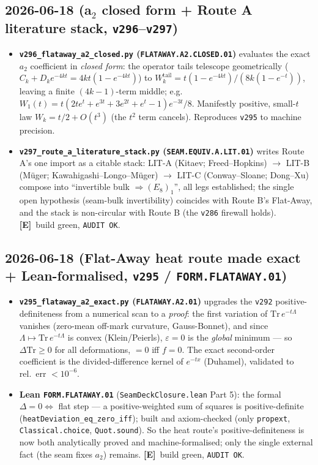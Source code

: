 \documentclass[11pt]{article}
\providecommand{\mE}{\textbf{[E]}}\providecommand{\mC}{\textbf{[C]}}
\providecommand{\vref}[1]{\texttt{#1}}
\begin{document}
\subsection*{2026-06-18 (a$_2$ closed form + Route A literature stack, \texttt{v296}--\texttt{v297})}
\begin{itemize}
\item \textbf{\texttt{v296\_flataway\_a2\_closed.py} (\texttt{FLATAWAY.A2.CLOSED.01})} evaluates the exact $a_2$
  coefficient in \emph{closed form}: the operator tails telescope geometrically
  ($C_k+D_k e^{-4kt}=4kt(1-e^{-4kt})$) to $W_k^{\mathrm{tail}}=t(1-e^{-4kt})/(8k(1-e^{-t}))$, leaving a finite
  $(4k{-}1)$-term middle; e.g.\ $W_1(t)=t(2t e^{t}+e^{3t}+3e^{2t}+e^{t}-1)e^{-3t}/8$. Manifestly positive,
  small-$t$ law $W_k=t/2+O(t^3)$ (the $t^2$ term cancels). Reproduces \vref{v295} to machine precision.
\item \textbf{\texttt{v297\_route\_a\_literature\_stack.py} (\texttt{SEAM.EQUIV.A.LIT.01})} writes Route A's one
  import as a citable stack: LIT-A (Kitaev; Freed--Hopkins) $\to$ LIT-B (M\"uger; Kawahigashi--Longo--M\"uger)
  $\to$ LIT-C (Conway--Sloane; Dong--Xu) compose into ``invertible bulk $\Rightarrow(E_8)_1$'', all legs
  established; the single open hypothesis (seam-bulk invertibility) coincides with Route B's Flat-Away, and the
  stack is non-circular with Route B (the \vref{v286} firewall holds). \mE\ build green, \texttt{AUDIT OK}.
\end{itemize}

\subsection*{2026-06-18 (Flat-Away heat route made exact + Lean-formalised, \texttt{v295} / \texttt{FORM.FLATAWAY.01})}
\begin{itemize}
\item \textbf{\texttt{v295\_flataway\_a2\_exact.py} (\texttt{FLATAWAY.A2.01})} upgrades the \vref{v292}
  positive-definiteness from a numerical scan to a \emph{proof}: the first variation of
  $\mathrm{Tr}\,e^{-t\Lambda}$ vanishes (zero-mean off-mark curvature, Gauss-Bonnet), and since
  $\Lambda\mapsto\mathrm{Tr}\,e^{-t\Lambda}$ is convex (Klein/Peierls), $\varepsilon{=}0$ is the \emph{global}
  minimum --- so $\Delta\mathrm{Tr}\ge0$ for all deformations, $=0$ iff $f=0$. The exact second-order
  coefficient is the divided-difference kernel of $e^{-tx}$ (Duhamel), validated to rel.\ err $<10^{-6}$.
\item \textbf{Lean \texttt{FORM.FLATAWAY.01}} (\texttt{SeamDeckClosure.lean} Part 5): the formal
  $\Delta{=}0\Leftrightarrow$ flat step --- a positive-weighted sum of squares is positive-definite
  (\texttt{heatDeviation\_eq\_zero\_iff}); built and axiom-checked (only \texttt{propext},
  \texttt{Classical.choice}, \texttt{Quot.sound}). So the heat route's positive-definiteness is now both
  analytically proved and machine-formalised; only the single external fact (the seam fixes $a_2$) remains.
  \mE\ build green, \texttt{AUDIT OK}.
\end{itemize}
\end{document}
